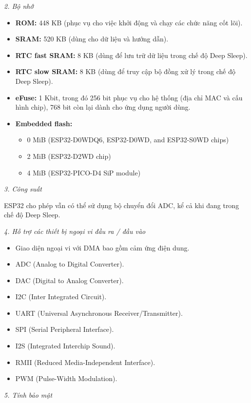 \documentclass[12pt,a4paper]{report}
\begin{document}
\textit{2. Bộ nhớ}
\begin{itemize}
    \item \textbf{ROM:} 448 KB (phục vụ cho việc khởi động và chạy các chức năng
    cốt lõi).
    \item \textbf{SRAM:} 520 KB (dùng cho dữ liệu và hướng dẫn).
    \item \textbf{RTC fast SRAM:} 8 KB (dùng để lưu trữ dữ liệu trong chế độ
    Deep Sleep).
    \item \textbf{RTC slow SRAM:} 8 KB (dùng để truy cập bộ đồng xử lý trong
    chế độ Deep Sleep).
    \item \textbf{eFuse:} 1 Kbit, trong đó 256 bit phục vụ cho hệ thống (địa chỉ
    MAC và cấu hình chip), 768 bit còn lại dành cho ứng dụng người dùng.
    \item \textbf{Embedded flash:}
    \begin{itemize}
        \item 0 MiB (ESP32-D0WDQ6, ESP32-D0WD, and ESP32-S0WD chips)
        \item 2 MiB (ESP32-D2WD chip)
        \item 4 MiB (ESP32-PICO-D4 SiP module)
    \end{itemize}
\end{itemize}

\textit{3. Công suất}

ESP32 cho phép vẫn có thể sử dụng bộ chuyển đổi ADC, kể cả khi đang trong
chế độ Deep Sleep.

\textit{4. Hỗ trợ các thiết bị ngoại vi đầu ra / đầu vào}
\begin{itemize}
    \item Giao diện ngoại vi với DMA bao gồm cảm ứng điện dung.
    \item ADC (Analog to Digital Converter).
    \item DAC (Digital to Analog Converter).
    \item I2C (Inter Integrated Circuit).
    \item UART (Universal Asynchronous Receiver/Transmitter).
    \item SPI (Serial Peripheral Interface).
    \item I2S (Integrated Interchip Sound).
    \item RMII (Reduced Media-Independent Interface).
    \item PWM (Pulse-Width Modulation).
\end{itemize}

\textit{5. Tính bảo mật}
\end{document}
